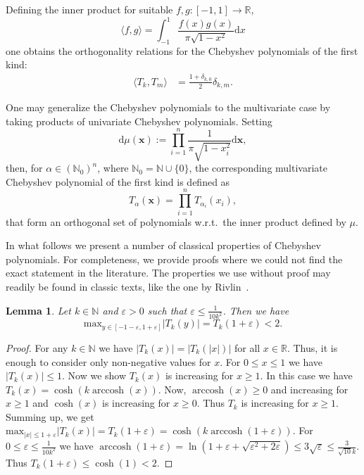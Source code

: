 \documentclass[11pt]{article}
\newcommand{\N}{\mathbb{N}}
\renewcommand{\max}{\mathrm{max}}
\renewcommand{\epsilon}{\varepsilon}
\newcommand{\eps}{\epsilon}
\newtheorem{lemma}[defin]{Lemma}
\theoremstyle{definition}
\DeclareMathOperator{\arccosh}{arccosh}
\begin{document}
	Defining the inner product for suitable $f,g : [-1,1] \rightarrow \mathbb{R}$,
	\[ \langle f,g \rangle = \int_{-1}^1 \frac{f(x)g(x)}{\pi \sqrt{1-x^2} } \mathrm{d}x \]
		one obtains the orthogonality relations for the Chebyshev polynomials of the first kind:
	\begin{align}
	\langle T_k, T_m \rangle &= \frac{1+\delta_{k,0}}{2} \delta_{k,m}.%
		\end{align}


	 One may generalize the Chebyshev polynomials to the multivariate case by taking
products of univariate Chebyshev polynomials. Setting
	\begin{equation}\label{mu cheb}
	  \mathrm{d}\mu(\textbf{x}) := \prod_{i=1}^{n} \frac{1}{\pi \sqrt{1-x_i^2}}\mathrm{d}\textbf{x},
	\end{equation}
then, for $\alpha \in (\mathbb{N}_0)^n$, where $\N_0 = \N \cup \{0\}$, the corresponding  multivariate Chebyshev polynomial of the first kind is defined as
	\[
	T_\alpha(\textbf{x}) = \prod_{i=1}^n  T_{\alpha_i}(x_i),%
	\]
that form an orthogonal set of polynomials w.r.t.\ the inner product defined by $\mu$.
	
In what follows we present a number of classical properties of Chebyshev polynomials. For completeness, we provide proofs where we could not find
the exact statement in the literature. The properties we use without proof may readily be found in classic texts, like the one by Rivlin~\cite{rivlin2020chebyshev}.


\begin{lemma} \label{lem:bound outside}
Let $k \in \N$ and $\eps>0$ such that $\eps \leq \frac{1}{10k^2}$. Then we have
\[
\max_{y \in [-1-\eps,1+\eps]} |T_k(y)| = T_k(1+\eps) <  2.
\]
\end{lemma}
\begin{proof}
For any $k \in \mathbb{N}$ we have $|T_k(x)| = |T_k(|x|)|$ for all $x \in \mathbb{R}$. Thus, it is enough to consider only non-negative values for $x$.
For $0 \le x \le 1$ we have $|T_k(x)| \le 1$.
Now we show $T_k(x)$ is increasing for  $x \ge 1$. In this case we have
$T_k(x) = \cosh(k \arccosh (x) )$.   Now, $\arccosh(x) \ge 0$ and increasing for $x \ge 1$ and $\cosh(x)$ is increasing for $x \ge 0$. Thus $T_k$ is increasing for $x \ge 1$.
Summing up, we get $\max_{|x| \le 1+ \eps} |T_k(x)| = T_k(1+\eps) = \cosh(k \arccosh (1 + \eps) )$.
For $0 \le \eps \le \frac{1}{10 k^2} $ we have $\arccosh (1 + \eps)  = \ln (1+ \eps + \sqrt{\eps^2 + 2\eps})  \le 3\sqrt{\eps} \le \frac{3}{\sqrt{10} k}$. Thus   $T_k(1+\eps)  \le \cosh( 1)  < 2$.
\end{proof}
\end{document}
